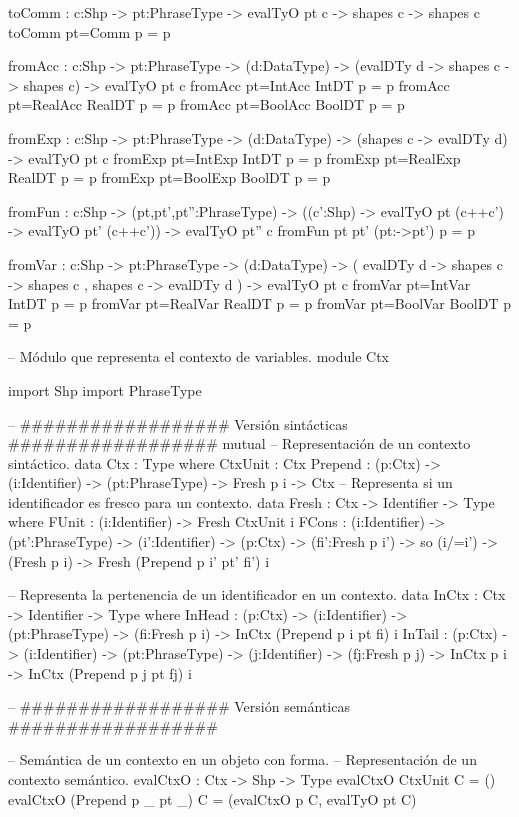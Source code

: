 \begin{code}
toComm : {c:Shp} -> {pt:PhraseType} -> evalTyO pt c -> shapes c -> shapes c
toComm {pt=Comm} p = p

fromAcc : {c:Shp} -> {pt:PhraseType} -> 
          (d:DataType) -> (evalDTy d -> shapes c -> shapes c) -> evalTyO pt c
fromAcc {pt=IntAcc}  IntDT  p = p
fromAcc {pt=RealAcc} RealDT p = p
fromAcc {pt=BoolAcc} BoolDT p = p

fromExp : {c:Shp} -> {pt:PhraseType} -> 
        (d:DataType) -> (shapes c -> evalDTy d) -> evalTyO pt c
fromExp {pt=IntExp}  IntDT  p = p
fromExp {pt=RealExp} RealDT p = p
fromExp {pt=BoolExp} BoolDT p = p

fromFun : {c:Shp} -> (pt,pt',pt'':PhraseType) -> 
          ((c':Shp) -> evalTyO pt (c++c') -> evalTyO pt' (c++c')) -> evalTyO pt'' c
fromFun pt pt' (pt:->pt') p = p

fromVar : {c:Shp} -> {pt:PhraseType} -> 
        (d:DataType) -> ( evalDTy d -> shapes c -> shapes c
                        , shapes c -> evalDTy d
                        ) -> evalTyO pt c
fromVar {pt=IntVar}  IntDT  p = p
fromVar {pt=RealVar} RealDT p = p
fromVar {pt=BoolVar} BoolDT p = p

-- Módulo que representa el contexto de variables.
module Ctx

import Shp
import PhraseType

-- ################## Versión sintácticas ##################
mutual
    -- Representación de un contexto sintáctico.
    data Ctx : Type where
        CtxUnit : Ctx
        Prepend : (p:Ctx) -> (i:Identifier) -> (pt:PhraseType) -> 
                  Fresh p i -> Ctx
    -- Representa si un identificador es fresco para un contexto.
    data Fresh : Ctx -> Identifier -> Type where
        FUnit : (i:Identifier) -> Fresh CtxUnit i
        FCons : (i:Identifier) -> (pt':PhraseType) -> (i':Identifier) -> 
                (p:Ctx) -> (fi':Fresh p i') -> so (i/=i') -> (Fresh p i) -> 
                Fresh (Prepend p i' pt' fi') i

-- Representa la pertenencia de un identificador en un contexto.
data InCtx : Ctx -> Identifier -> Type where
    InHead : (p:Ctx) -> (i:Identifier) -> (pt:PhraseType) -> 
             (fi:Fresh p i) -> InCtx (Prepend p i pt fi) i
    InTail : (p:Ctx) -> (i:Identifier) -> (pt:PhraseType) -> 
             (j:Identifier) -> (fj:Fresh p j) -> 
             InCtx p i -> InCtx (Prepend p j pt fj) i

-- ################## Versión semánticas ##################

-- Semántica de un contexto en un objeto con forma.
-- Representación de un contexto semántico.
evalCtxO : Ctx -> Shp -> Type
evalCtxO CtxUnit C = ()
evalCtxO (Prepend p _ pt _) C = (evalCtxO p C, evalTyO pt C)


\end{code}
